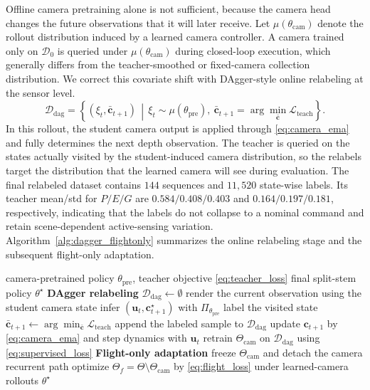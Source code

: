 \documentclass[letterpaper,journal]{IEEEtran}
\begin{document}
Offline camera pretraining alone is not sufficient, because the camera head
changes the future observations that it will later receive. Let
$\mu(\theta_{\mathrm{cam}})$ denote the rollout distribution induced by a
learned camera controller. A camera trained only on
$\mathcal{D}_{0}$ is queried under $\mu(\theta_{\mathrm{cam}})$ during
closed-loop execution,
which generally differs from the teacher-smoothed or fixed-camera collection
distribution. We correct this covariate shift with DAgger-style online
relabeling at the sensor level.
\begin{equation}
    \mathcal{D}_{\mathrm{dag}}
    =
    \left\{
    (\xi_t,\bar{\mathbf{c}}_{t+1})
    \,\middle|\,
    \xi_t\sim\mu(\theta_{\mathrm{pre}}),\ 
    \bar{\mathbf{c}}_{t+1}
    =\arg\min_{\bar{\mathbf{c}}}\mathcal{L}_{\mathrm{teach}}
    \right\}.
    \label{eq:dagger_dataset}
\end{equation}
In this rollout, the student camera output is applied through
\eqref{eq:camera_ema} and fully determines the next depth observation. The
teacher is queried on the states actually visited by the student-induced
camera distribution, so the relabels target the distribution that the learned
camera will see during evaluation. The final relabeled dataset contains $144$
sequences and $11{,}520$ state-wise labels. Its teacher mean/std for $P/E/G$
are $0.584/0.408/0.403$ and $0.164/0.197/0.181$, respectively, indicating that
the labels do not collapse to a nominal command and retain scene-dependent
active-sensing variation.
Algorithm~\ref{alg:dagger_flightonly} summarizes the online relabeling stage
and the subsequent flight-only adaptation.

\begin{algorithm}[t]
\caption{DAgger Relabeling and Flight-Only Adaptation}
\label{alg:dagger_flightonly}
\begin{algorithmic}[1]
\Require camera-pretrained policy $\theta_{\mathrm{pre}}$,
teacher objective \eqref{eq:teacher_loss}
\Ensure final split-stem policy $\theta^\star$
\Statex \textbf{DAgger relabeling}
\State $\mathcal{D}_{\mathrm{dag}}\gets\emptyset$
    \State render the current observation using the student camera state
    \State infer $(\mathbf{u}_t,\mathbf{c}_{t+1}^{\star})$ with
    $\Pi_{\theta_{\mathrm{pre}}}$
    \State label the visited state
    $\bar{\mathbf{c}}_{t+1}\gets
    \arg\min_{\bar{\mathbf{c}}}\mathcal{L}_{\mathrm{teach}}$
    \State append the labeled sample to $\mathcal{D}_{\mathrm{dag}}$
    \State update $\mathbf{c}_{t+1}$ by \eqref{eq:camera_ema}
    and step dynamics with $\mathbf{u}_t$
  \EndFor
\EndFor
\State retrain $\Theta_{\mathrm{cam}}$ on $\mathcal{D}_{\mathrm{dag}}$
using \eqref{eq:supervised_loss}
\Statex \textbf{Flight-only adaptation}
\State freeze $\Theta_{\mathrm{cam}}$ and detach the camera recurrent path
\State optimize $\Theta_f=\Theta\setminus\Theta_{\mathrm{cam}}$ by
\eqref{eq:flight_loss} under learned-camera rollouts
\State \Return $\theta^\star$
\end{algorithmic}
\end{algorithm}
\end{document}
